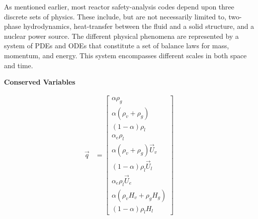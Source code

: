 
As mentioned earlier, most reactor safety-analysis codes depend upon three discrete sets of physics.
These include, but are not necessarily limited to, two-phase hydrodynamics, heat-transfer between the fluid and a solid structure, and a nuclear power source.
The different physical phenomena are represented by a system of PDEs and ODEs that constitute a set of balance laws for mass, momentum, and energy.
This system encompasses different scales in both space and time.
\pagebreak
\begin{minipage}{0.42\textwidth}
\begin{center}\textbf{Conserved Variables}\end{center}
\begin{align}
\Vec{q} & = 
\begin{bmatrix} 
\alpha \rho_g  \\
\alpha \left( \rho_v + \rho_g \right)\\
\left(1-\alpha\right) \rho_l \\
\alpha_e \rho_l \\
\alpha \left( \rho_v + \rho_g \right) \Vec{U}_v \\
\left( 1-\alpha \right) \rho_l \Vec{U}_l \\
\alpha_e \rho_l \Vec{U}_e \\
\alpha \left( \rho_v H_v+ \rho_g H_g \right)\\
\left( 1 -\alpha \right) \rho_l H_l
\end{bmatrix} 
\end{align}
\end{minipage}
